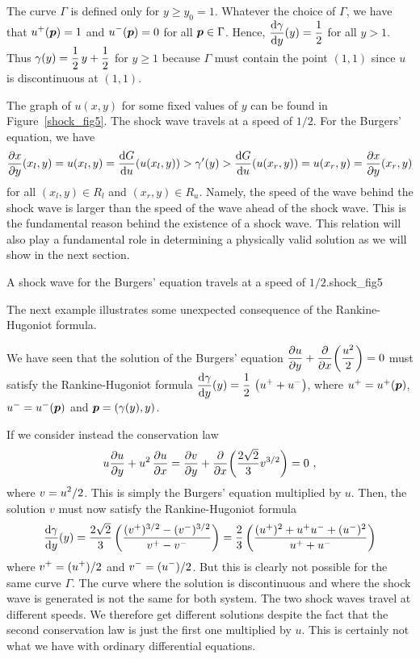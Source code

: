 \begin{egg}
The curve $\Gamma$ is defined only for $y\geq y_0 = 1$.  Whatever the choice
of $\Gamma$, we have that $\DS u^+(\VEC{p}) = 1$ and
$\DS u^-(\VEC{p}) = 0$ for all
$\VEC{p} \in \Gamma$.  Hence,
$\DS \dydx{\gamma}{y}(y) = \frac{1}{2}$ for all $y>1$.
Thus $\DS \gamma(y) = \frac{1}{2}\, y + \frac{1}{2}$
for $y \geq 1$ because $\Gamma$ must contain the point $(1,1)$ since
$u$ is discontinuous at $(1,1)$.

The graph of $u(x,y)$ for some fixed values of $y$ can be found in
Figure~\ref{shock_fig5}.  The shock wave travels at a speed of $1/2$.
For the Burgers' equation, we have
\[
\pdydx{x}{y}(x_l,y) = u(x_l,y) = \dydx{G}{u}(u(x_l,y))
> \gamma'(y) > \dydx{G}{u}(u(x_r,y)) = u(x_r,y) = \pdydx{x}{y}(x_r,y) 
\]
for all $(x_l,y) \in R_l$ and $(x_r,y) \in R_u$.  Namely, the speed of
the wave behind the shock wave is larger than the speed of the wave
ahead of the shock wave.  This is the fundamental reason behind the
existence of a shock wave.  This relation will also play a fundamental
role in determining a physically valid solution as we will show in the
next section.
\end{egg}

{A shock wave for the Burgers' equation travels at a speed of
$1/2$.}{shock_fig5}

The next example illustrates some unexpected consequence of the
Rankine-Hugoniot formula.

\begin{egg}
We have seen that the solution of the Burgers' equation     \label{eggNonEquiv}
$\DS \pdydx{u}{y} + \pdfdx{\left(\frac{u^2}{2}\right)}{x} = 0$
must satisfy the Rankine-Hugoniot formula
$\DS \dydx{\gamma}{y}(y)
= \frac{1}{2} \, \left(u^+ + u^-\right)$, where
$u^+ = u^+(\VEC{p})$, $u^- = u^-(\VEC{p})$
and $\VEC{p}=(\gamma(y),y)$.

If we consider instead the conservation law
\[
u \pdydx{u}{y} + u^2\,\pdydx{u}{x}
= \pdydx{v}{y} + \pdfdx{\left(\frac{2\sqrt{2}}{3} v^{3/2}\right)}{x} = 0 \ ,
\]
where $\DS v = u^2/2$.  This is simply the Burgers' equation
multiplied by $u$.  Then, the solution $v$ must now satisfy the
Rankine-Hugoniot formula
\[
\dydx{\gamma}{y}(y)
= \frac{2\sqrt{2}}{3} \left( \frac{(v^+)^{3/2} - (v^-)^{3/2}} {v^+ - v^-}
\right)
= \frac{2}{3} \left(\frac{(u^+)^2 + u^+ u^- + (u^-)^2}{u^+ + u^-}\right)
\]
where $\DS v^+ = (u^+)/2$ and
$\DS v^- = (u^-)/2$.  But this is clearly not
possible for the same curve $\Gamma$.  The curve where the solution is
discontinuous and where the shock wave is generated is not the same
for both system.  The two shock waves travel at different speeds.
We therefore get different solutions despite the fact that the second
conservation law is just the first one multiplied by $u$.  This is
certainly not what we have with ordinary differential equations.
\end{egg}

